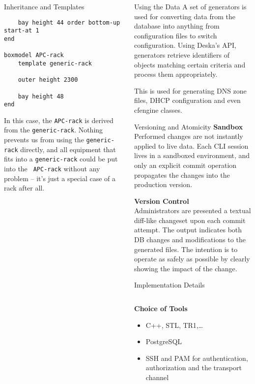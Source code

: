 \documentclass{beamer}
\newcommand{\Heading}[1]{\hskip1cm\textbf{#1}\\}
\begin{document}
\begin{frame}[fragile]
\begin{columns}[t]
\begin{column}{.48\linewidth}
\begin{block}{Inheritance and Templates}
\begin{lstlisting}
    bay height 44 order bottom-up start-at 1
end

boxmodel APC-rack
    template generic-rack

    outer height 2300

    bay height 48
end
\end{lstlisting}

In this case, the {\tt APC-rack} is \alert{derived} from the {\tt generic-rack}.
Nothing prevents us from using the {\tt generic-rack} directly, and all
equipment that fits into a {\tt generic-rack} could be put into the {\tt
APC-rack} without any problem -- it's just a \alert{special case} of a rack
after all.
\end{block}

\end{column}

\begin{column}{.48\linewidth}

\begin{block}{Using the Data}
A set of \alert{generators} is used for converting data from the database into
anything from \alert{configuration files} to \alert{switch configuration}.
Using Deska's API, generators retrieve identifiers of objects matching certain
\alert{criteria} and process them appropriately.

This is used for generating DNS \alert{ zone files}, \alert{DHCP} configuration
and even \alert{cfengine} classes.
\end{block}

\begin{block}{Versioning and Atomicity}
\Heading{Sandbox}
Performed changes are not instantly applied to live data.  Each CLI session
lives in a sandboxed environment, and only an explicit \alert{commit} operation
propagates the changes into the production version.

\Heading{Version Control}
Administrators are presented a textual \alert{diff-like} changeset upon each
commit attempt.  The output indicates both \alert{DB changes} and modifications
to the \alert{generated files}.  The intention is to operate as safely as
possible by clearly showing the \alert{impact of the change}.
\end{block}

\begin{block}{Implementation Details}
\begin{columns}[T]
\begin{column}{.4\linewidth}
\Heading{Choice of Tools}
\begin{itemize}
    \item C++, STL, TR1,\ldots
    \item PostgreSQL
    \item SSH and PAM for authentication, authorization and the transport
        channel
\end{itemize}
\end{column}


\end{columns}
\end{block}
\end{column}
\end{columns}
\end{frame}
\end{document}
